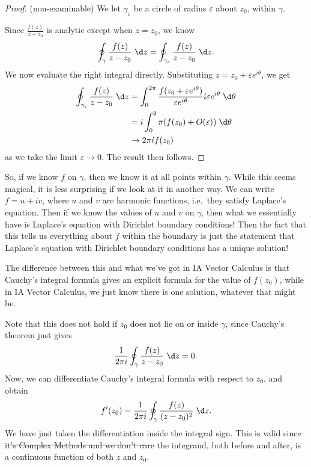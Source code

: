 \documentclass[a4paper]{article}
\begin{document}
\begin{proof}(non-examinable)
  We let $\gamma_\varepsilon$ be a circle of radius $\varepsilon$ about $z_0$, within $\gamma$.
  \begin{center}
  \end{center}
  Since $\frac{f(z)}{z - z_0}$ is analytic except when $z = z_0$, we know
  \[
    \oint_\gamma \frac{f(z)}{z - z_0} \;\d z = \oint_{\gamma_\varepsilon} \frac{f(z)}{z - z_0}\;\d z.
  \]
  We now evaluate the right integral directly. Substituting $z = z_0 + \varepsilon e^{i\theta}$, we get
  \begin{align*}
    \oint_{\gamma_\varepsilon} \frac{f(z)}{z - z_0}\;\d z &= \int_0^{2\pi} \frac{f(z_0 + \varepsilon e^{i\theta})}{\varepsilon e^{i\theta}} i\varepsilon e^{i\theta} \;\d \theta\\
    &= i\int_0^2\pi (f(z_0) + O(\varepsilon))\;\d \theta\\
    &\rightarrow 2\pi i f(z_0)
  \end{align*}
  as we take the limit $\varepsilon \to 0$. The result then follows.
\end{proof}
So, if we know $f$ on $\gamma$, then we know it at all points within $\gamma$. While this seems magical, it is less surprising if we look at it in another way. We can write $f = u + iv$, where $u$ and $v$ are harmonic functions, i.e.\ they satisfy Laplace's equation. Then if we know the values of $u$ and $v$ on $\gamma$, then what we essentially have is Laplace's equation with Dirichlet boundary conditions! Then the fact that this tells us everything about $f$ within the boundary is just the statement that Laplace's equation with Dirichlet boundary conditions has a unique solution!

The difference between this and what we've got in IA Vector Calculus is that Cauchy's integral formula gives an explicit formula for the value of $f(z_0)$, while in IA Vector Calculus, we just know there is one solution, whatever that might be.

Note that this does not hold if $z_0$ does not lie on or inside $\gamma$, since Cauchy's theorem just gives
\[
  \frac{1}{2\pi i} \oint_\gamma \frac{f(z)}{z - z_0} \;\d z = 0.
\]
Now, we can differentiate Cauchy's integral formula with respect to $z_0$, and obtain
\[
  f'(z_0) = \frac{1}{2\pi i} \oint_\gamma \frac{f(z)}{(z - z_0)^2}\;\d z.
\]
We have just taken the differentiation inside the integral sign. This is valid since \st{it's Complex Methods and we don't care} the integrand, both before and after, is a continuous function of both $z$ and $z_0$.
\end{document}
